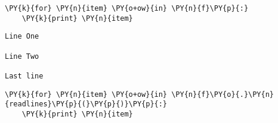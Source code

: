 
{\par%
\vspace{-1\baselineskip}%
}%
\begin{notebookcell}[39]%
\begin{addmargin}[\cellleftmargin]{0em}%
{\smaller%
\par%
%
\vspace{-1\smallerfontscale}%
\begin{Verbatim}[commandchars=\\\{\}]
\PY{k}{for} \PY{n}{item} \PY{o+ow}{in} \PY{n}{f}\PY{p}{:}
    \PY{k}{print} \PY{n}{item}
\end{Verbatim}
%
\par%
\vspace{-1\smallerfontscale}}%
\end{addmargin}
\end{notebookcell}

\par\vspace{1\smallerfontscale}%
    \begin{addmargin}[\cellleftmargin]{0em}%
    {\smaller%
    \vspace{-1\smallerfontscale}%
    
    \begin{Verbatim}[commandchars=\\\{\}]
Line One

Line Two

Last line
    \end{Verbatim}
}%
    \end{addmargin}%

{\par%
\vspace{-1\baselineskip}%
}%
\begin{notebookcell}[44]%
\begin{addmargin}[\cellleftmargin]{0em}%
{\smaller%
\par%
%
\vspace{-1\smallerfontscale}%
\begin{Verbatim}[commandchars=\\\{\}]
\PY{k}{for} \PY{n}{item} \PY{o+ow}{in} \PY{n}{f}\PY{o}{.}\PY{n}{readlines}\PY{p}{(}\PY{p}{)}\PY{p}{:}
    \PY{k}{print} \PY{n}{item}
\end{Verbatim}
%
\par%
\vspace{-1\smallerfontscale}}%
\end{addmargin}
\end{notebookcell}


